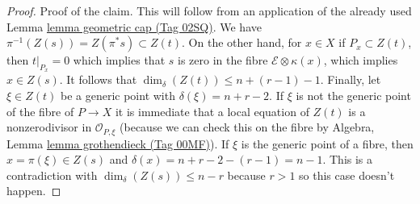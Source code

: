 \documentclass{amsart}
\theoremstyle{plain}
\theoremstyle{definition}
\theoremstyle{remark}
\numberwithin{equation}{subsection}
\begin{document}
\begin{proof}
\medskip\noindent
Proof of the claim. This will follow from an application of
the already used Lemma \href{https://stacks.math.columbia.edu/tag/02SQ}{lemma geometric cap (Tag 02SQ)}.
We have $\pi^{-1}(Z(s)) = Z(\pi^*s) \subset Z(t)$.
On the other hand, for $x \in X$ if $P_x \subset Z(t)$, then
$t|_{P_x} = 0$ which implies that $s$ is zero in the fibre
$\mathcal{E} \otimes \kappa(x)$, which implies $x \in Z(s)$.
It follows that $\dim_\delta(Z(t)) \leq n + (r - 1) - 1$.
Finally, let $\xi \in Z(t)$ be a generic point with
$\delta(\xi) = n + r - 2$. If $\xi$ is not the generic point
of the fibre of $P \to X$ it is immediate that
a local equation of $Z(t)$ is a nonzerodivisor in $\mathcal{O}_{P, \xi}$
(because we can check this on the fibre by
Algebra, Lemma \href{https://stacks.math.columbia.edu/tag/00MF}{lemma grothendieck (Tag 00MF)}).
If $\xi$ is the generic point of a fibre, then $x = \pi(\xi) \in Z(s)$
and $\delta(x) = n + r - 2 - (r - 1) = n - 1$. This is a contradiction
with $\dim_\delta(Z(s)) \leq n - r$ because $r > 1$
so this case doesn't happen.
\end{proof}
\end{document}
